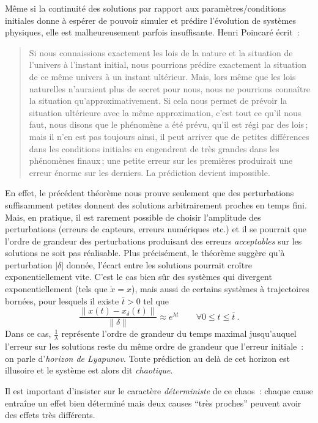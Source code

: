 \hypertarget{rem_chao}{}
\begin{remarque}\label{rem_chao}
Même si la continuité des solutions par rapport aux
paramètres/conditions initiales donne à espérer de pouvoir simuler et
prédire l'évolution de systèmes physiques, elle est malheureusement
parfois insuffisante. Henri Poincaré écrit~:

\begin{quote}
Si nous connaissions exactement les lois de la nature et la situation de
l'univers à l'instant initial, nous pourrions prédire exactement la
situation de ce même univers à un instant ultérieur. Mais, lors même que
les lois naturelles n'auraient plus de secret pour nous, nous ne
pourrions connaître la situation qu'approximativement. Si cela nous
permet de prévoir la situation ultérieure avec la même approximation,
c'est tout ce qu'il nous faut, nous disons que le phénomène a été prévu,
qu'il est régi par des lois\,; mais il n'en est pas toujours ainsi, il
peut arriver que de petites différences dans les conditions initiales en
engendrent de très grandes dans les phénomènes finaux\,; une petite
erreur sur les premières produirait une erreur énorme sur les derniers.
La prédiction devient impossible.
\end{quote}

En effet, le précédent théorème nous prouve seulement que des
perturbations suffisamment petites donnent des solutions arbitrairement
proches en temps fini. Mais, en pratique, il est rarement possible de
choisir l'amplitude des perturbations (erreurs de capteurs, erreurs
numériques etc.) et il se pourrait que l'ordre de grandeur des
perturbations produisant des erreurs \emph{acceptables} sur les
solutions ne soit pas réalisable. Plus précisément, le théorème suggère
qu'à perturbation \(|\delta|\) donnée, l'écart entre les solutions
pourrait croître exponentiellement vite. C'est le cas bien sûr des
systèmes qui divergent exponentiellement (tels que \(\dot{x}=x\)), mais
aussi de certains systèmes à trajectoires bornées, pour lesquels il
existe \(\overline{t}>0\) tel que \[
\frac{\|x(t)-x_\delta(t)\|}{\|\delta\|} \approx e^{\lambda t}  \qquad \forall 0\leq t\leq \overline{t} \ .
\] Dans ce cas, \(\frac{1}{\lambda}\) représente l'ordre de grandeur du
temps maximal jusqu'auquel l'erreur sur les solutions reste du même
ordre de grandeur que l'erreur initiale~: on parle d'\emph{horizon de
Lyapunov}. Toute prédiction au delà de cet horizon est illusoire et le
système est alors dit \emph{chaotique}.

Il est important d'insister sur le caractère \emph{déterministe} de ce
chaos~: chaque cause entraîne un effet bien déterminé mais deux causes
``très proches'' peuvent avoir des effets très différents.
\end{remarque}

